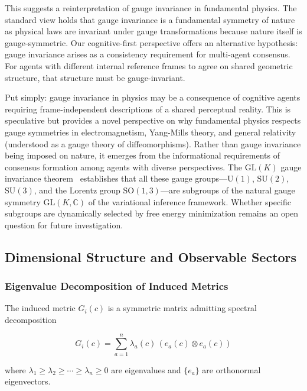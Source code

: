 \documentclass[11pt]{article}
\begin{document}
This suggests a reinterpretation of gauge invariance in fundamental physics. The standard view holds that gauge invariance is a fundamental symmetry of nature as physical laws are invariant under gauge transformations because nature itself is gauge-symmetric. Our cognitive-first perspective offers an alternative hypothesis: gauge invariance arises as a consistency requirement for multi-agent consensus. For agents with different internal reference frames to agree on shared geometric structure, that structure must be gauge-invariant.

Put simply: gauge invariance in physics may be a consequence of cognitive agents requiring frame-independent descriptions of a shared perceptual reality. This is speculative but provides a novel perspective on why fundamental physics respects gauge symmetries in electromagnetism, Yang-Mills theory, and general relativity (understood as a gauge theory of diffeomorphisms). Rather than gauge invariance being imposed on nature, it emerges from the informational requirements of consensus formation among agents with diverse perspectives. The $\mathrm{GL}(K)$ gauge invariance theorem~\cite{Dennis2026GL} establishes that all these gauge groups---$\mathrm{U}(1)$, $\mathrm{SU}(2)$, $\mathrm{SU}(3)$, and the Lorentz group $\mathrm{SO}(1,3)$---are subgroups of the natural gauge symmetry $\mathrm{GL}(K, \mathbb{C})$ of the variational inference framework. Whether specific subgroups are dynamically selected by free energy minimization remains an open question for future investigation.

\subsection{Dimensional Structure and Observable Sectors}
\label{sec:observable_sectors}

\subsubsection{Eigenvalue Decomposition of Induced Metrics}

The induced metric $G_i(c)$ is a symmetric matrix admitting spectral decomposition

\begin{equation}
G_i(c) = \sum_{a=1}^n \lambda_a(c) \, (e_a(c) \otimes e_a(c))
\end{equation}

where $\lambda_1 \geq \lambda_2 \geq \cdots \geq \lambda_n \geq 0$ are eigenvalues and $\{e_a\}$ are orthonormal eigenvectors.
\end{document}
